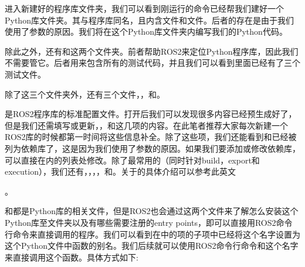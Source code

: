 \documentclass[letterpaper,10pt,english]{sphinxmanual}
\begin{document}
\sphinxAtStartPar
进入新建好的程序库文件夹，我们可以看到刚运行的命令已经帮我们建好一个Python库文件夹。其与程序库同名，且内含文件和文件。后者的存在是由于我们使用了参数的原因。我们将在这个Python库文件夹内编写我们的Python代码。

\sphinxAtStartPar
除此之外，还有和这两个文件夹。前者帮助ROS2来定位Python程序库，因此我们不需要管它。后者用来包含所有的测试代码，并且我们可以看到里面已经有了三个测试文件。

\sphinxAtStartPar
除了这三个文件夹外，还有三个文件，，和。

\sphinxAtStartPar
{}是ROS2程序库的标准配置文件。打开后我们可以发现很多内容已经预生成好了，但是我们还需填写或更新，，和这几项的内容。在此笔者推荐大家每次新建一个ROS2库的时候都第一时间将这些信息补全。除了这些项，我们还能看到和已经被列为依赖库了，这是因为我们使用了参数的原因。如果我们要添加或修改依赖库，可以直接在内的列表处修改。除了最常用的（同时针对build，export和execution），我们还有，，，，和。关于的具体介绍可以参考此英文%
\begin{footnote}[93]\sphinxAtStartFootnote
{}
%
\end{footnote}。

\sphinxAtStartPar
{}和都是Python库的相关文件，但是ROS2也会通过这两个文件来了解怎么安装这个Python库至文件夹以及有哪些需要注册的entry
points，即可以直接用ROS2命令行命令来直接调用的程序。我们可以看到在中的项的子项中已经将这个名字设置为这个Python文件中函数的别名。我们后续就可以使用ROS2命令行命令和这个名字来直接调用这个函数。具体方式如下:
\end{document}
